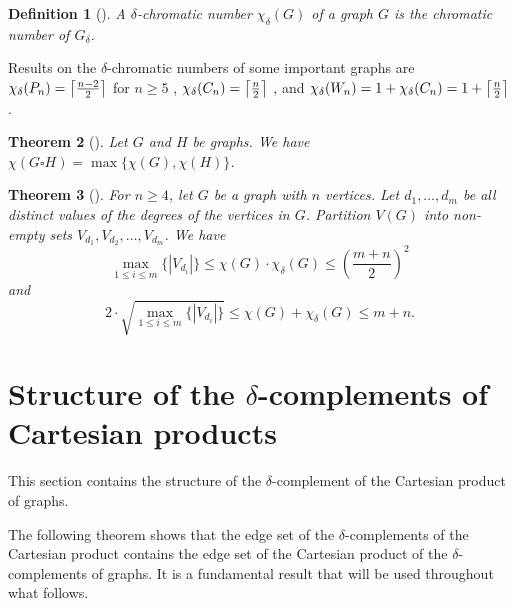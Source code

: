 \documentclass[12pt]{amsart}
\newtheorem{theorem}{Theorem}
\newtheorem{definition}[theorem]{Definition}
\DeclarePairedDelimiter{\ceil}{\lceil}{\rceil}
\begin{document}
\begin{definition}[\cite{Vichitkunakorn2023}] A $\delta$-\textit{chromatic number} $\chi_\delta(G)$ of a graph $G$ is the chromatic number of $G_{\delta}$.
\end{definition}

Results on the $\delta$-chromatic numbers of some important graphs are
$\chi_\delta(P_n) = \ceil*{\frac{n-2}{2}}$ for $n\geq 5$ \cite{Vichitkunakorn2023},  $\chi_\delta(C_n) = \ceil*{\frac{n}{2}}$ \cite{Vichitkunakorn2023}, and
$\chi_\delta(W_n) = 1 + \chi_\delta(C_n) = 1 + \ceil*{\frac{n}{2}}$.

\begin{theorem}[\cite{sabidussi_1957}]
\label{thm: chiProduct}
    Let $G$ and $H$ be graphs. We have $\chi(G\square H)=\max\{\chi(G),\chi(H)\}$.
\end{theorem}

\begin{theorem}[\cite{Vichitkunakorn2023}]
\label{thm: NG_bound}
    For $n\geq 4$, let $G$ be a graph with $n$ vertices. Let $d_1,\dots,d_m$ be all distinct values of the degrees of the vertices in $G$. Partition $V(G)$ into non-empty sets $V_{d_1},V_{d_2},\dots, V_{d_m}$. We have 
    \[
    \max_{1\leq i\leq m}\{|V_{d_i}|\}\leq \chi(G)\cdot \chi_{\delta}(G)\leq \left(\frac{m+n}{2}\right)^2
    \]
    and 
    \[
    2\cdot \sqrt{\max_{1\leq i\leq m} \{|V_{d_i}|\}}\leq \chi(G)+\chi_{\delta}(G)
\leq m+n.
    \]
\end{theorem}

\section{Structure of the $\delta$-complements of Cartesian products}
This section contains the structure of the $\delta$-complement of the Cartesian product of graphs.

The following theorem shows that the edge set of the $\delta$-complements of the Cartesian product contains the edge set of the Cartesian product of the $\delta$-complements of graphs.
It is a fundamental result that will be used throughout what follows.
\end{document}
